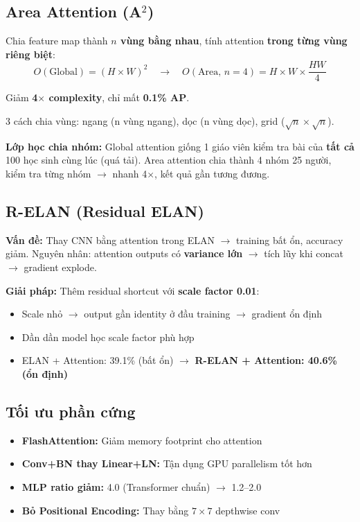 \subsection{Area Attention (A$^2$)}
Chia feature map thành \textbf{$n$ vùng bằng nhau}, tính attention \textbf{trong từng vùng riêng biệt}:
\[O(\text{Global}) = (H \times W)^2 \quad \rightarrow \quad O(\text{Area, } n=4) = H \times W \times \frac{HW}{4}\]

Giảm \textbf{4$\times$ complexity}, chỉ mất \textbf{0.1\% AP}.

3 cách chia vùng: ngang (n vùng ngang), dọc (n vùng dọc), grid ($\sqrt{n} \times \sqrt{n}$).

\begin{analogybox}
\textbf{Lớp học chia nhóm:} Global attention giống 1 giáo viên kiểm tra bài của \textbf{tất cả} 100 học sinh cùng lúc (quá tải). Area attention chia thành 4 nhóm 25 người, kiểm tra từng nhóm $\rightarrow$ nhanh 4$\times$, kết quả gần tương đương.
\end{analogybox}

\subsection{R-ELAN (Residual ELAN)}
\textbf{Vấn đề:} Thay CNN bằng attention trong ELAN $\rightarrow$ training bất ổn, accuracy giảm. Nguyên nhân: attention outputs có \textbf{variance lớn} $\rightarrow$ tích lũy khi concat $\rightarrow$ gradient explode.

\textbf{Giải pháp:} Thêm residual shortcut với \textbf{scale factor 0.01}:
\begin{itemize}
    \item Scale nhỏ $\rightarrow$ output gần identity ở đầu training $\rightarrow$ gradient ổn định
    \item Dần dần model học scale factor phù hợp
    \item ELAN + Attention: 39.1\% (bất ổn) $\rightarrow$ \textbf{R-ELAN + Attention: 40.6\% (ổn định)}
\end{itemize}

\subsection{Tối ưu phần cứng}
\begin{itemize}
    \item \textbf{FlashAttention:} Giảm memory footprint cho attention
    \item \textbf{Conv+BN thay Linear+LN:} Tận dụng GPU parallelism tốt hơn
    \item \textbf{MLP ratio giảm:} 4.0 (Transformer chuẩn) $\rightarrow$ 1.2--2.0
    \item \textbf{Bỏ Positional Encoding:} Thay bằng $7\times7$ depthwise conv
\end{itemize}

